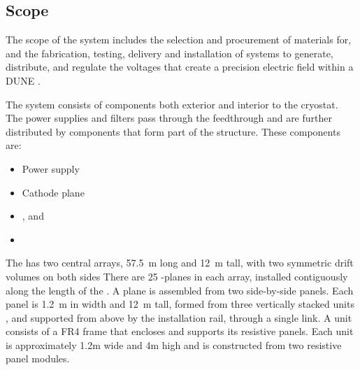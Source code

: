 \subsection{Scope}
\label{sec:fdsp-hv-scope}

The scope of the  system includes the selection and procurement of materials for, and the fabrication, testing, delivery and installation of systems to generate, distribute, and regulate the voltages that
create a precision electric field within a DUNE . %

The  system consists of components both exterior and interior to the cryostat. The  power supplies and filters pass through the  feedthrough and are further distributed by components that form part of the  structure. 
These components are:
\begin{itemize}
\item Power supply 
\item Cathode plane 
\item {},  and 
\item {}
\end{itemize}


The  has two central  arrays, \SI{57.5}{\meter} long and \SI{12}{\meter} tall, with two symmetric drift volumes on both sides
 There are 25 -planes in each  array, installed contiguously along the length of the . A  plane is assembled from two side-by-side  panels. Each  panel is  \SI{1.2}{\meter} in width and  \SI{12}{\meter} tall, formed from three vertically stacked  units
, and supported from above by the  installation rail, through a single link.
A  unit consists of a FR4 frame that encloses and supports its resistive panels.  Each  unit is approximately 1.2m wide and 4m high and is constructed from two resistive panel modules.

